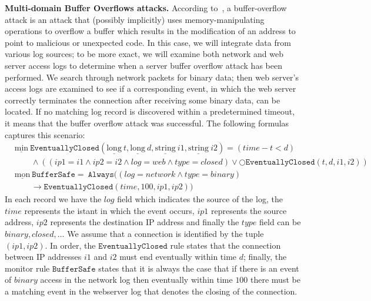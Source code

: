 \documentclass[english]{article}
\begin{document}
\textbf{Multi-domain Buffer Overflows attacks.}
According to~\cite{piromsopa2006buffer}, a buffer-overflow attack is an attack that (possibly implicitly) uses memory-manipulating operations to overflow a buffer which results in the modification of an address to point to malicious or unexpected code. In this case, we will integrate data from various log sources; to be more exact, we will examine both network and web server access logs to determine when a server buffer overflow attack has been performed. We search through network packets for binary data; then web server's access logs are examined to see if a corresponding event, in which the web server correctly terminates the connection after receiving some binary data, can be located. If no matching log record is discovered within a predetermined timeout, it means that the buffer overflow attack was successful. The following formulas captures this scenario:
\begin{align*} 
    & \underline{\text{min}}\ \mathtt{EventuallyClosed}(\underline{\text{long}}\ t,\underline{\text{long}}\ d,\underline{\text{string}}\ i1,\underline{\text{string}}\ i2) = (time-t<d)\\
    & \quad\quad\land ((ip1=i1\land ip2=i2\land log=web\land type=closed)\lor \bigcirc\mathtt{EventuallyClosed}(t,d,i1,i2) ) \\
    & \underline{\text{mon}}\ \mathtt{BufferSafe} =\ \mathtt{Always}((log=network\land type=binary) \\
    & \quad\quad\rightarrow\mathtt{EventuallyClosed}(time,100,ip1,ip2))
\end{align*}
In each record we have the $log$ field which indicates the source of the log, the $time$ represents the istant in which the event occurs, $ip1$ represents the source address, $ip2$ represents the destination IP address and finally the $type$ field can be $binary, closed,\ldots$ We assume that a connection is identified by the tuple $(ip1,ip2)$. In order, the $\mathtt{EventuallyClosed}$ rule states that the connection between IP addresses $i1$ and $i2$ must end eventually within time $d$; finally, the monitor rule $\mathtt{BufferSafe}$ states that it is always the case that if there is an event of $binary$ access in the network log then eventually within time $100$ there must be a matching event in the webserver log that denotes the closing of the connection. 
\end{document}

